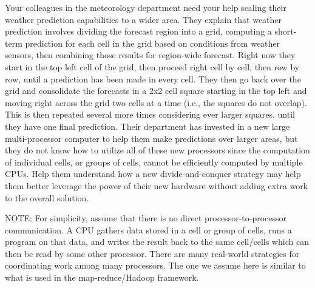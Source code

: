 \documentclass[12pt]{article}
\begin{document}
\renewcommand{\headrulewidth}{0.5pt}

\phantom{Test}

Your colleagues in the meteorology department need your help scaling their weather prediction capabilities to a wider area. They explain that weather prediction involves dividing the forecast region into a grid, computing a short-term prediction for each cell in the grid based on conditions from weather sensors, then combining those results for region-wide forecast. Right now they start in the top left cell of the grid, then proceed right cell by cell, then row by row, until a prediction has been made in every cell. They then go back over the grid and consolidate the forecasts in a 2x2 cell square starting in the top left and moving right across the grid two cells at a time (i.e., the squares do not overlap). This is then repeated several more times considering ever larger squares, until they have one final prediction. Their department has invested in a new large multi-processor computer to help them make predictions over larger areas, but they do not know how to utilize all of these new processors since the computation of individual cells, or groups of cells, cannot be efficiently computed by multiple CPUs. Help them understand how a new divide-and-conquer strategy may help them better leverage the power of their new hardware without adding extra work to the overall solution.

NOTE: For simplicity, assume that there is no direct processor-to-processor communication. A CPU gathers data stored in a cell or group of cells, runs a program on that data, and writes the result back to the same cell/cells which can then be read by some other processor. There are many real-world strategies for coordinating work among many processors. The one we assume here is similar to what is used in the map-reduce/Hadoop framework.



\pagebreak
\end{document}
